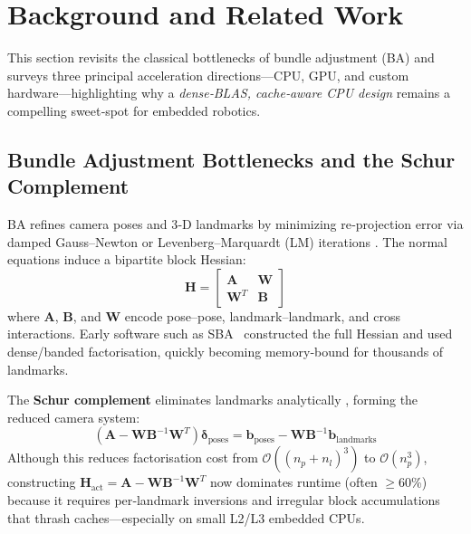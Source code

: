 \section{Background and Related Work}\label{sec:related_work}



This section revisits the classical bottlenecks of bundle adjustment (BA) and surveys three principal acceleration directions—CPU, 
GPU, and custom hardware—highlighting why a \emph{dense‑BLAS, cache‑aware CPU design} remains a compelling sweet‑spot for embedded 
robotics.

\subsection{Bundle Adjustment Bottlenecks and the Schur Complement}
\label{subsec:ba_bottlenecks} BA refines camera poses and 3‑D landmarks by minimizing re‑projection error via damped Gauss–Newton or Levenberg–Marquardt (LM) iterations \cite{triggs1999bundle,hartley2003multiple}. The normal equations 
induce a bipartite block Hessian:
\begin{equation}
\mathbf{H} = \begin{bmatrix}
\mathbf{A} & \mathbf{W} \\
\mathbf{W}^T & \mathbf{B}
\end{bmatrix}
\end{equation}
where $\mathbf{A}$, $\mathbf{B}$, and $\mathbf{W}$ encode pose–pose, landmark–landmark, and cross interactions. Early software such as
SBA~\cite{lourakis2009sba} constructed the full Hessian and used dense/banded factorisation, quickly becoming memory‑bound for thousands of landmarks.

The \textbf{Schur complement} eliminates landmarks analytically \cite{Konolige2010SparseSB}, forming the reduced camera system:
\begin{equation}
(\mathbf{A} - \mathbf{W}\mathbf{B}^{-1}\mathbf{W}^T)\boldsymbol{\delta}_{\text{poses}} = \mathbf{b}_{\text{poses}} - \mathbf{W}\mathbf{B}^{-1}\mathbf{b}_{\text{landmarks}}
\end{equation}
Although this reduces factorisation cost from $\mathcal{O}((n_p + n_l)^3)$ to $\mathcal{O}(n_p^3)$, constructing 
$\mathbf{H}_{\text{act}} = \mathbf{A} - \mathbf{W}\mathbf{B}^{-1}\mathbf{W}^T$ now dominates runtime (often $\geq$60\%) 
because it requires per‑landmark inversions and irregular block accumulations that thrash caches—especially on small L2/L3 
embedded CPUs.



